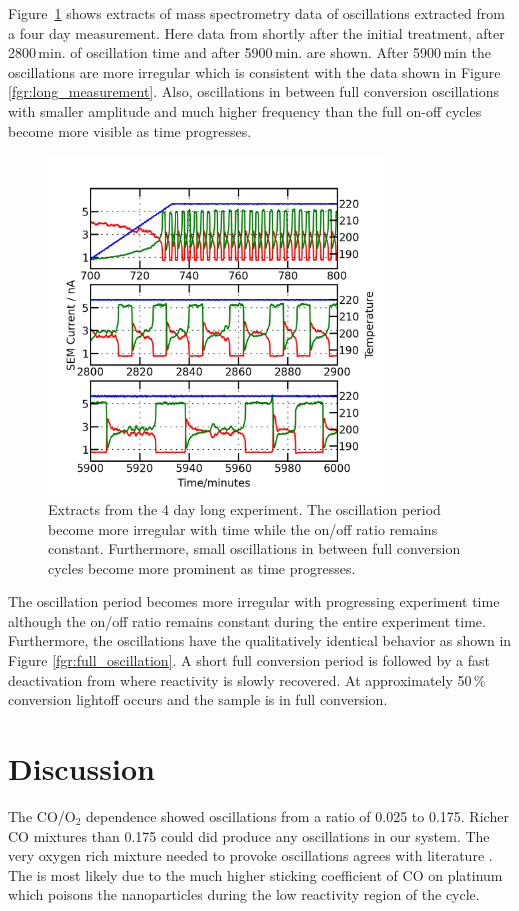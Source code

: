 \documentclass[8.5pt,twoside,twocolumn]{article}
\begin{document}
Figure~\ref{fgr:extracts} shows extracts of mass spectrometry data of oscillations extracted from a four day measurement. Here data from shortly after the initial treatment, after 2800\,min. of oscillation time and after 5900\,min. are shown. After 5900\,min the oscillations are more irregular which is consistent with the data shown in Figure \ref{fgr:long_measurement}. Also, oscillations in between full conversion oscillations with smaller amplitude and much higher frequency than the full on-off cycles become more visible as time progresses.
\begin{figure}[h]
  \centering
  \includegraphics[width=9cm]{extracts_from_very_long_oscillation.png}
  \caption{Extracts from the 4 day long experiment. The oscillation period become more irregular with time while the on/off ratio remains constant. Furthermore, small oscillations in between full conversion cycles become more prominent as time progresses.}
  \label{fgr:extracts}
\end{figure}

The oscillation period becomes more irregular with progressing experiment time although the on/off ratio remains constant during the entire experiment time. Furthermore, the oscillations have the qualitatively identical behavior as shown in Figure \ref{fgr:full_oscillation}. A short full conversion period is followed by a fast deactivation from where reactivity is slowly recovered. At approximately 50\,\% conversion lightoff occurs and the sample is in full conversion.

\section{Discussion}
The CO/O$_2$ dependence showed oscillations from a ratio of 0.025 to 0.175. Richer CO mixtures than 0.175 could did produce any oscillations in our system. The very oxygen rich mixture needed to provoke oscillations agrees with literature \cite{Singh2010,Hendriksen2005}. The is most likely due to the much higher sticking coefficient of CO on platinum which poisons the nanoparticles during the low reactivity region of the cycle.
\end{document}
